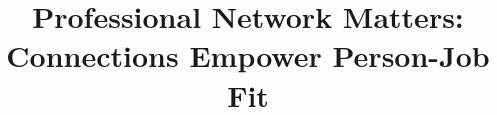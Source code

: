 \documentclass[sigconf, nonacm]{acmart}
\begin{document}
\title[Professional Network Matters: Connections Empower Person-Job Fit]{Professional Network Matters:\\ Connections Empower Person-Job Fit}



\renewcommand{\shortauthors}{Hao Chen et al.}





\maketitle








\appendix

\balance

\end{document}
